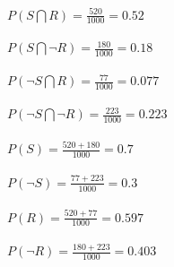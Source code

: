 \documentclass[paper=a4, fontsize=11pt]{scrartcl} %
\numberwithin{equation}{section} %
\numberwithin{figure}{section} %
\begin{document}
$P(S \bigcap R) = \frac{520}{1000} = 0.52$\\\\
$P(S \bigcap \neg R) = \frac{180}{1000} = 0.18$\\\\
$P(\neg S \bigcap R) = \frac{77}{1000} = 0.077$\\\\
$P(\neg S \bigcap \neg R) = \frac{223}{1000} = 0.223$\\\\
$P(S) = \frac{520 + 180}{1000} = 0.7$\\\\
$P(\neg S) = \frac{77 + 223}{1000} = 0.3$\\\\
$P(R) = \frac{520 + 77}{1000} = 0.597$\\\\
$P(\neg R) = \frac{180 + 223}{1000} = 0.403$\\\\
\end{document}
